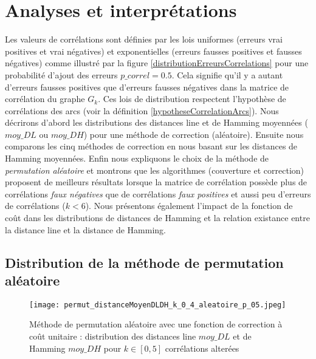 \documentclass[onecolumn, 12pt]{book}
\begin{document}
\section{Analyses et interpr\'etations}
Les valeurs de corr\'elations sont d\'efinies par les lois uniformes (erreurs vrai positives et vrai n\'egatives) et exponentielles (erreurs fausses positives et fausses n\'egatives) comme illustr\'e par la figure \ref{distributionErreursCorrelations} pour une probabilit\'e d'ajout des erreurs $p\_correl = 0.5$. Cela  signifie qu'il y a autant d'erreurs fausses positives que d'erreurs fausses n\'egatives dans la matrice de corr\'elation du graphe $G_{k}$. Ces lois de distribution respectent l'hypoth\`ese de corr\'elations des arcs (voir la d\'efinition \ref{hypotheseCorrelationArcs}). 
\newline
Nous d\'ecrirons d'abord les distributions des distances line et de Hamming moyenn\'ees ($moy\_DL$ ou $moy\_DH$) pour une m\'ethode de correction (al\'eatoire). Ensuite nous comparons les cinq m\'ethodes de correction en nous basant sur les distances de Hamming moyenn\'ees. 
Enfin nous expliquons le choix de la m\'ethode de {\em permutation al\'eatoire} et montrons que les algorithmes (couverture et correction) proposent de meilleurs r\'esultats lorsque la matrice de corr\'elation poss\`ede plus de corr\'elations {\em faux n\'egatives} que de corr\'elations {\em faux positives} et aussi peu d'erreurs de corr\'elations ($k < 6$). 
\newline
Nous pr\'esentons \'egalement l'impact de la fonction de co\^ut dans les distributions  de distances de Hamming et 
la relation existance entre la distance line et la distance de Hamming.

\subsection{Distribution de la m\'ethode de permutation al\'eatoire}
\begin{figure}[htb!] 
\centering
\texttt{[image: permut\_distanceMoyenDLDH\_k\_0\_4\_aleatoire\_p\_05.jpeg]}
\caption{ M\'ethode de permutation al\'eatoire avec une fonction de correction \`a co\^ut unitaire : distribution des distances line $moy\_DL$ et de Hamming $moy\_DH$ pour $k \in [0,  5]$ corr\'elations alter\'ees}
\label{permut_distanceMoyenDLDH_k_0_5_aleatoire_p_05} 
\end{figure}
\end{document}
